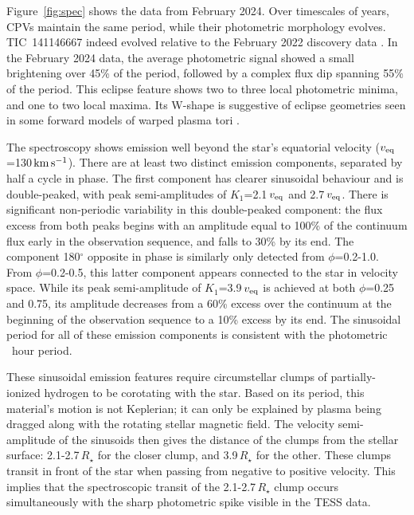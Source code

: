 \documentclass{nature3}
\newcommand{\kms}{\ensuremath{\rm km\,s^{-1}}}
\begin{document}
Figure~\ref{fig:spec} shows the data from February 2024.  Over
timescales of years, CPVs maintain the same period, while their
photometric morphology evolves.  TIC~141146667 indeed evolved relative
to the February 2022 discovery data \cite{Bouma2024}.  In the February
2024 data, the average photometric signal showed a small brightening
over 45\% of the period, followed by a complex flux dip spanning 55\%
of the period.  This eclipse feature shows two to three local
photometric minima, and one to two local maxima.  Its W-shape is
suggestive of eclipse geometries seen in some forward models of warped
plasma tori \cite{Townsend2008}.

The spectroscopy shows emission well beyond the star's equatorial
velocity ($v_{\rm eq}$=130\,\kms).  There are at least two distinct
emission components, separated by half a cycle in phase.  The first
component has clearer sinusoidal behaviour and is double-peaked, with
peak semi-amplitudes of $K_1$=2.1\,$v_{\rm eq}$ and 2.7\,$v_{\rm eq}$.
There is significant non-periodic variability in this double-peaked
component: the flux excess from both peaks begins with an amplitude
equal to 100\% of the continuum flux early in the observation
sequence, and falls to 30\% by its end.  The component 180$^\circ$
opposite in phase is similarly only detected from $\phi$=0.2-1.0.
From $\phi$=0.2-0.5, this latter component appears connected to the
star in velocity space.  While its peak semi-amplitude of
$K_1$=3.9\,$v_{\rm eq}$ is achieved at both $\phi$=0.25 and 0.75, its
amplitude decreases from a 60\% excess over the continuum at the
beginning of the observation sequence to a 10\% excess by its end.
The sinusoidal period for all of these emission components is
consistent with the photometric \periodhr\ hour period.  

These sinusoidal emission features require circumstellar clumps of
partially-ionized hydrogen to be corotating with the star.  
Based on its period, this material's motion is not Keplerian; it can
only be explained by plasma being dragged along with the rotating
stellar magnetic field. 
The velocity semi-amplitude of the sinusoids then gives the distance
of the clumps from the stellar surface: 2.1-2.7\,$R_\star$ for the
closer clump, and 3.9\,$R_\star$ for the other.   These clumps transit
in front of the star when passing from negative to positive velocity.
This implies that the spectroscopic transit of the 2.1-2.7\,$R_\star$
clump occurs simultaneously with the sharp photometric spike visible
in the TESS data.
\end{document}
